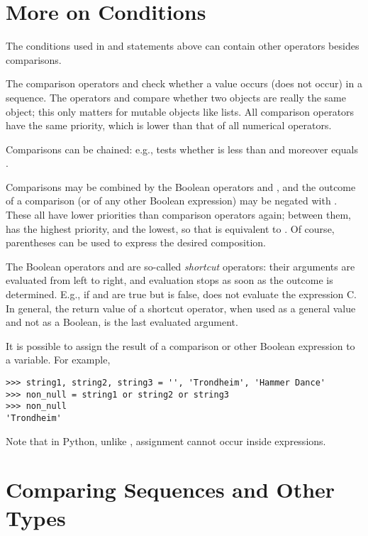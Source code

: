 \documentclass{manual}
\begin{document}
\section{More on Conditions}
\label{conditions}

The conditions used in  and  statements above can
contain other operators besides comparisons.

The comparison operators  and  check whether a value
occurs (does not occur) in a sequence.  The operators  and
 compare whether two objects are really the same object; this
only matters for mutable objects like lists.  All comparison operators
have the same priority, which is lower than that of all numerical
operators.

Comparisons can be chained: e.g.,  tests whether 
is less than  and moreover  equals .

Comparisons may be combined by the Boolean operators  and
, and the outcome of a comparison (or of any other Boolean
expression) may be negated with .  These all have lower
priorities than comparison operators again; between them,  has
the highest priority, and  the lowest, so that
 is equivalent to .  Of
course, parentheses can be used to express the desired composition.

The Boolean operators  and  are so-called
\emph{shortcut} operators: their arguments are evaluated from left to
right, and evaluation stops as soon as the outcome is determined.
E.g., if  and  are true but  is false,  does not evaluate the expression C.  In general, the
return value of a shortcut operator, when used as a general value and
not as a Boolean, is the last evaluated argument.

It is possible to assign the result of a comparison or other Boolean
expression to a variable.  For example,

\begin{verbatim}
>>> string1, string2, string3 = '', 'Trondheim', 'Hammer Dance'
>>> non_null = string1 or string2 or string3
>>> non_null
'Trondheim'
\end{verbatim}

Note that in Python, unlike \C{}, assignment cannot occur inside expressions.

\section{Comparing Sequences and Other Types}
\label{comparing}
\end{document}

